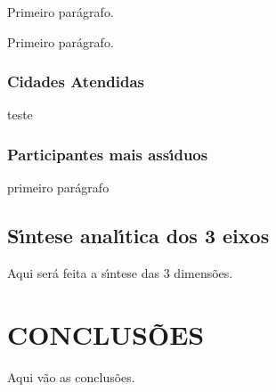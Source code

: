 \documentclass[
12pt,		%
openright,	%
twoside,  %
a4paper,			%
chapter=TITLE,		%
english,			%
french,				%
spanish,			%
brazil				%
]{USPSC-classe/USPSC}
\begin{document}
Primeiro par\'agrafo.














Primeiro par\'agrafo.














\subsection[Cidades Atendidas]{Cidades Atendidas}\label{Cidades Atendidas}
teste














\subsection[Participantes mais ass\'{\i}duos]{Participantes mais ass\'{\i}duos}\label{Participantes mais ass\'{\i}duos}
primeiro par\'agrafo














\section[S\'{\i}ntese anal\'{\i}tica dos 3 eixos]{S\'{\i}ntese anal\'{\i}tica dos 3 eixos}\label{S\'{\i}ntese anal\'{\i}tica dos 3 eixos}
Aqui ser\'a feita a s\'{\i}ntese das 3 dimens\~oes.














\chapter[CONCLUS\~OES]{CONCLUS\~OES}\label{CONCLUS\~OES}
Aqui v\~ao as conclus\~oes.
\end{document}
